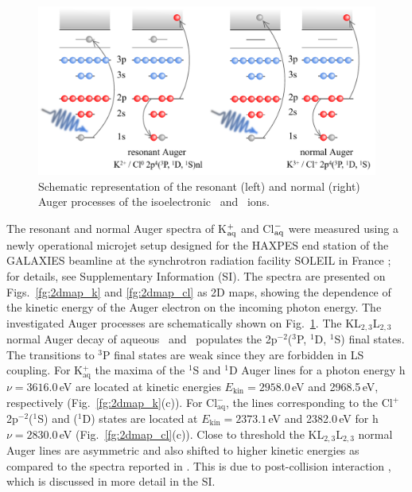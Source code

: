 \begin{figure}
\includegraphics[scale=0.8]{figures/auger_process.pdf}
\caption{Schematic representation of the resonant (left) and normal (right) Auger processes of the isoelectronic \ki~and \cli~ions.}
\label{fg:auger}
\end{figure}

The resonant and normal Auger spectra of K$^+_{\rm aq}$ and Cl$^-_{\rm aq}$ were measured using a newly operational microjet setup designed for the HAXPES end station of the GALAXIES beamline at the synchrotron radiation facility SOLEIL in France \citep{ceolin13:188,rueff15:175}; for details, see Supplementary Information (SI). 
{\color{red}The spectra are presented on Figs.\ \ref{fg:2dmap_k} and \ref{fg:2dmap_cl} as 2D maps, showing the dependence of the kinetic energy of the Auger electron on the incoming photon energy.}
The investigated Auger processes are schematically shown on Fig.\ \ref{fg:auger}. The KL$_{2,3}$L$_{2,3}$ normal Auger decay of aqueous \ki~and \cli~populates the 2p$^{-2}$($^3$P, $^1$D, $^1$S) final states. The transitions to $^3$P final states are weak since they are forbidden in LS coupling. For K$^{+}_{\text{aq}}$ the maxima of the $^1$S and $^1$D Auger lines for a photon energy h$\nu = 3616.0$\,eV are located at kinetic energies $E_{\text{kin}} = 2958.0$\,eV and 2968.5\,eV, respectively (Fig.\ \ref{fg:2dmap_k}(c)). For Cl$^{-}_{\text{aq}}$, the lines corresponding to the Cl$^{+}$ 2p$^{-2}$($^1$S) and ($^1$D) states are located at $E_{\text{kin}} = 2373.1$\,eV and 2382.0\,eV for h$\nu = 2830.0$\,eV (Fig.\ \ref{fg:2dmap_cl}(c)). Close to threshold the KL$_{2,3}$L$_{2,3}$ normal Auger lines are asymmetric and also shifted to higher kinetic energies as compared to the spectra reported in \citep{ceolin17:263003}. This is due to post-collision interaction \citep{russek86:911,guillemin15:012503}, which is discussed in more detail in the SI.


